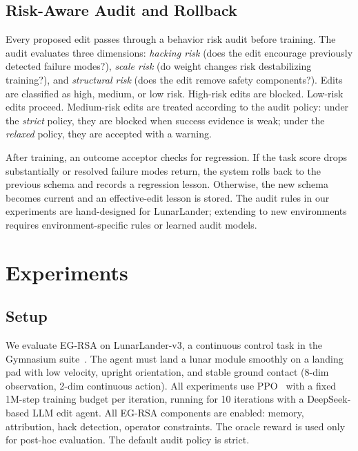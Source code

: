 \documentclass[11pt]{article}
\begin{document}
\subsection{Risk-Aware Audit and Rollback}

Every proposed edit passes through a behavior risk audit before training. The audit evaluates three dimensions: \emph{hacking risk} (does the edit encourage previously detected failure modes?), \emph{scale risk} (do weight changes risk destabilizing training?), and \emph{structural risk} (does the edit remove safety components?). Edits are classified as high, medium, or low risk. High-risk edits are blocked. Low-risk edits proceed. Medium-risk edits are treated according to the audit policy: under the \emph{strict} policy, they are blocked when success evidence is weak; under the \emph{relaxed} policy, they are accepted with a warning.

After training, an outcome acceptor checks for regression. If the task score drops substantially or resolved failure modes return, the system rolls back to the previous schema and records a regression lesson. Otherwise, the new schema becomes current and an effective-edit lesson is stored. The audit rules in our experiments are hand-designed for LunarLander; extending to new environments requires environment-specific rules or learned audit models.

\section{Experiments}
\label{sec:experiments}

\subsection{Setup}

We evaluate EG-RSA on LunarLander-v3, a continuous control task in the Gymnasium suite~\citep{towers2024gymnasium}. The agent must land a lunar module smoothly on a landing pad with low velocity, upright orientation, and stable ground contact (8-dim observation, 2-dim continuous action). All experiments use PPO~\citep{schulman2017ppo} with a fixed 1M-step training budget per iteration, running for 10 iterations with a DeepSeek-based LLM edit agent. All EG-RSA components are enabled: memory, attribution, hack detection, operator constraints. The oracle reward is used only for post-hoc evaluation. The default audit policy is strict.
\end{document}
